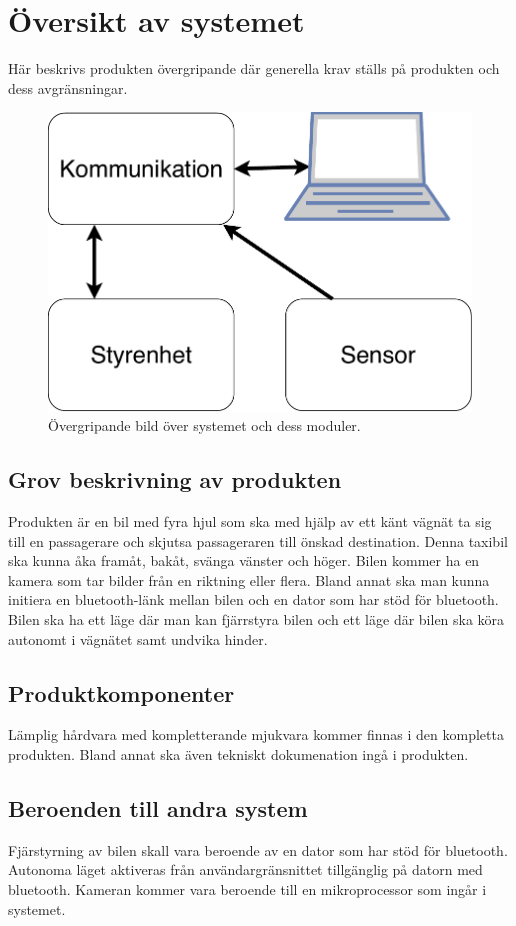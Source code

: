 \documentclass[kravspec/krav.tex]{subfiles}
\begin{document}
\section{Översikt av systemet}
Här beskrivs produkten övergripande där generella krav ställs på produkten och
dess avgränsningar.
\begin{figure}[h]
    \centering
    \includegraphics[width=0.6\linewidth]{kravspec/figures/overview-schema.pdf}
    \caption{Övergripande bild över systemet och dess moduler.}
    \label{fig:overview}
\end{figure}

\subsection{Grov beskrivning av produkten}
Produkten är en bil med fyra hjul som ska med hjälp av ett känt vägnät ta sig
till en passagerare och skjutsa passageraren till önskad destination. Denna
taxibil ska kunna åka framåt, bakåt, svänga vänster och höger. Bilen kommer ha
en kamera som tar bilder från en riktning eller flera.  Bland annat ska
man kunna initiera en bluetooth-länk mellan bilen och en dator som har stöd för
bluetooth. Bilen ska ha ett läge där man kan fjärrstyra bilen och ett läge där
bilen ska köra autonomt i vägnätet samt undvika hinder.

\subsection{Produktkomponenter}
Lämplig hårdvara med kompletterande mjukvara kommer finnas i den kompletta
produkten. Bland annat ska även tekniskt dokumenation ingå i produkten.

\subsection{Beroenden till andra system}
Fjärstyrning av bilen skall vara beroende av en dator som har stöd för
bluetooth.  Autonoma läget aktiveras från användargränsnittet tillgänglig på
datorn med bluetooth. Kameran kommer vara beroende till en mikroprocessor som
ingår i systemet.
\end{document}

